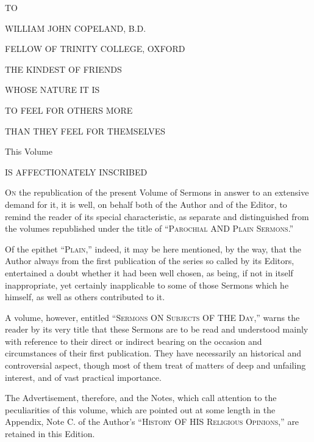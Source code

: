 




TO



WILLIAM JOHN COPELAND, B.D.



FELLOW OF TRINITY COLLEGE, OXFORD


THE KINDEST OF FRIENDS


WHOSE NATURE IT IS


TO FEEL FOR OTHERS MORE


THAN THEY FEEL FOR THEMSELVES



This Volume



IS AFFECTIONATELY INSCRIBED









O\textsc{n} the republication of the present Volume of Sermons in answer to
an extensive demand for it, it is well, on behalf both of the Author
and of the Editor, to remind the reader of its special characteristic,
as separate and distinguished from the volumes republished under the
title of ``P\textsc{arochial} AND
P\textsc{lain} S\textsc{ermons}.''


Of the epithet ``P\textsc{lain},'' indeed, it may be here mentioned,
by the way, that the Author always from the first publication of the
series so called by its Editors, entertained a doubt whether it had
been well chosen, as being, if not in itself inappropriate, yet
certainly inapplicable to some of those Sermons which he himself, as
well as others contributed to it.

A volume, however, entitled ``S\textsc{ermons} ON
S\textsc{ubjects} OF THE
D\textsc{ay},'' warns the reader by its very title that these Sermons are
to be read and understood mainly with reference to their direct or
indirect bearing on the occasion and circumstances of their first
publication. They have necessarily an historical and controversial
aspect, though most of them treat of matters of deep and unfailing
interest, and of vast practical importance.


The Advertisement, therefore, and the Notes, which call attention
to the peculiarities of this volume, which are pointed out at some
length in the Appendix, Note C. of the Author's ``H\textsc{istory}
OF HIS R\textsc{eligious}
O\textsc{pinions},'' are retained in this Edition.


